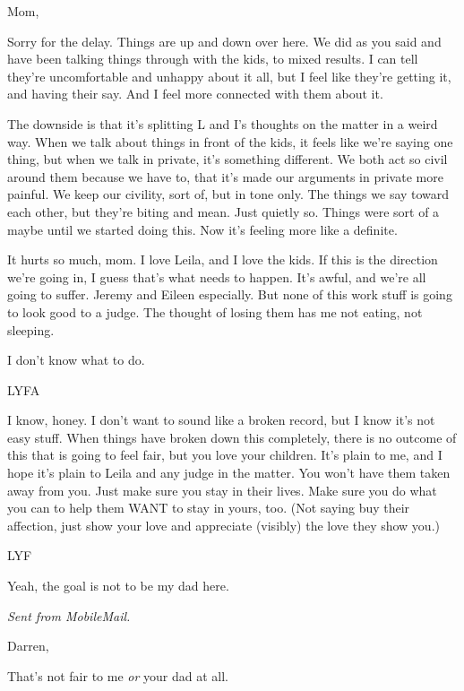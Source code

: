 \secdiv{}

Mom,

Sorry for the delay. Things are up and down over here. We did as you said and have been talking things through with the kids, to mixed results. I can tell they're uncomfortable and unhappy about it all, but I feel like they're getting it, and having their say. And I feel more connected with them about it.

The downside is that it's splitting L and I's thoughts on the matter in a weird way. When we talk about things in front of the kids, it feels like we're saying one thing, but when we talk in private, it's something different. We both act so civil around them because we have to, that it's made our arguments in private more painful. We keep our civility, sort of, but in tone only. The things we say toward each other, but they're biting and mean. Just quietly so. Things were sort of a maybe until we started doing this. Now it's feeling more like a definite.

It hurts so much, mom. I love Leila, and I love the kids. If this is the direction we're going in, I guess that's what needs to happen. It's awful, and we're all going to suffer. Jeremy and Eileen especially. But none of this work stuff is going to look good to a judge. The thought of losing them has me not eating, not sleeping.

I don't know what to do.

LYFA

\secdiv{}

I know, honey. I don't want to sound like a broken record, but I know it's not easy stuff. When things have broken down this completely, there is no outcome of this that is going to feel fair, but you love your children. It's plain to me, and I hope it's plain to Leila and any judge in the matter. You won't have them taken away from you. Just make sure you stay in their lives. Make sure you do what you can to help them WANT to stay in yours, too. (Not saying buy their affection, just show your love and appreciate (visibly) the love they show you.)

LYF

\secdiv{}

Yeah, the goal is not to be my dad here.

\emph{Sent from MobileMail.}

\secdiv{}

Darren,

That's not fair to me \emph{or} your dad at all.

